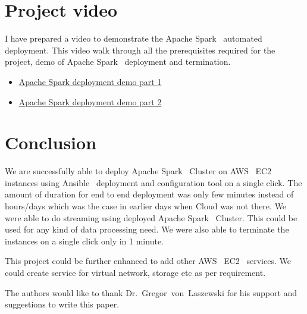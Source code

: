 \section{Project video}

I have prepared a video to demonstrate the Apache
Spark~\cite{hid-sp18-511-www-spark} automated deployment. This video
walk through all the prerequisites required for the project, demo of
Apache Spark~\cite{hid-sp18-511-www-spark} deployment and termination.

\begin{itemize}
	\item
        \href{https://d1b10bmlvqabco.cloudfront.net/attach/%
        jbkvbp3ed3m2ez/j6r57sr2IDo/jgenhk1lk5ly/%
        hidsp18511\_AWS\_EC2\_Deployment\_1.mp4}
        {Apache Spark deployment demo part 1}
        \item
        \href{https://d1b10bmlvqabco.cloudfront.net/attach/%
        jbkvbp3ed3m2ez/j6r57sr2IDo/jgeniacbvn7m/%
        hidsp18511\_AWS\_EC2\_Deployment\_2.mp4}
        {Apache	Spark deployment demo part 2}
\end{itemize}

\section{Conclusion}

We are successfully able to deploy Apache
Spark~\cite{hid-sp18-511-www-spark} Cluster on
AWS~\cite{hid-sp18-511-www-aws} EC2~\cite{hid-sp18-511-www-ec2}
instances using Ansible~\cite{hid-sp18-511-www-ansible} deployment and
configuration tool on a single click. The amount of duration for end
to end deployment was only few minutes instead of hours/days which was
the case in earlier days when Cloud was not there. We were able to do
streaming using deployed Apache Spark~\cite{hid-sp18-511-www-spark}
Cluster. This could be used for any kind of data processing need. We
were also able to terminate the instances on a single click only in 1
minute.

This project could be further enhanced to add other
AWS~\cite{hid-sp18-511-www-aws} EC2~\cite{hid-sp18-511-www-ec2}
services. We could create service for virtual network, storage etc as
per requirement.

\begin{acks}

  The authors would like to thank Dr.~Gregor~von~Laszewski for his
  support and suggestions to write this paper.

\end{acks}


 

